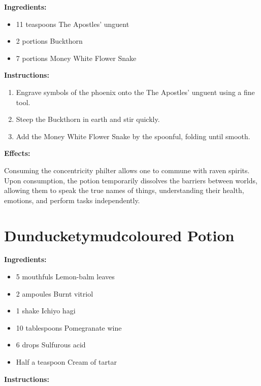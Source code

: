 \documentclass{article}
\begin{document}
\textbf{Ingredients:}

\begin{itemize}
  \item 11 teaspoons The Apostles' unguent
  \item 2 portions Buckthorn
  \item 7 portions Money White Flower Snake
\end{itemize}

\textbf{Instructions:}

\begin{enumerate}
  \item Engrave symbols of the phoenix onto the The Apostles' unguent using a fine tool.
  \item Steep the Buckthorn in earth and stir quickly.
  \item Add the Money White Flower Snake by the spoonful, folding until smooth.
\end{enumerate}

\textbf{Effects:}

Consuming the concentricity philter allows one to commune with raven spirits. Upon consumption, the potion temporarily dissolves the barriers between worlds, allowing them to speak the true names of things, understanding their health, emotions, and perform tasks independently.

\newpage
\section*{Dunducketymudcoloured Potion}

\textbf{Ingredients:}

\begin{itemize}
  \item 5 mouthfuls Lemon-balm leaves
  \item 2 ampoules Burnt vitriol
  \item 1 shake Ichiyo hagi
  \item 10 tablespoons Pomegranate wine
  \item 6 drops Sulfurous acid
  \item Half a teaspoon Cream of tartar
\end{itemize}

\textbf{Instructions:}
\end{document}
